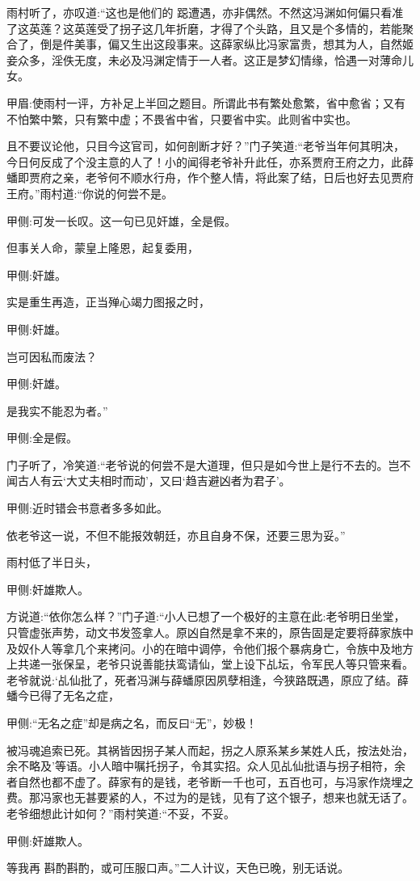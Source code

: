 \begin{parag}
    雨村听了，亦叹道:“这也是他们的 跽遭遇，亦非偶然。不然这冯渊如何偏只看准了这英莲？这英莲受了拐子这几年折磨，才得了个头路，且又是个多情的，若能聚合了，倒是件美事，偏又生出这段事来。这薛家纵比冯家富贵，想其为人，自然姬妾众多，淫佚无度，未必及冯渊定情于一人者。这正是梦幻情缘，恰遇一对薄命儿女。\begin{note}甲眉:使雨村一评，方补足上半回之题目。所谓此书有繁处愈繁，省中愈省；又有不怕繁中繁，只有繁中虚；不畏省中省，只要省中实。此则省中实也。\end{note}且不要议论他，只目今这官司，如何剖断才好？”门子笑道:“老爷当年何其明决，今日何反成了个没主意的人了！小的闻得老爷补升此任，亦系贾府王府之力，此薛蟠即贾府之亲，老爷何不顺水行舟，作个整人情，将此案了结，日后也好去见贾府王府。”雨村道:“你说的何尝不是。\begin{note}甲侧:可发一长叹。这一句已见奸雄，全是假。\end{note}但事关人命，蒙皇上隆恩，起复委用，\begin{note}甲侧:奸雄。\end{note}实是重生再造，正当殚心竭力图报之时，\begin{note}甲侧:奸雄。\end{note}岂可因私而废法？\begin{note}甲侧:奸雄。\end{note}是我实不能忍为者。”\begin{note}甲侧:全是假。\end{note}门子听了，冷笑道:“老爷说的何尝不是大道理，但只是如今世上是行不去的。岂不闻古人有云‘大丈夫相时而动’，又曰‘趋吉避凶者为君子’。\begin{note}甲侧:近时错会书意者多多如此。\end{note}依老爷这一说，不但不能报效朝廷，亦且自身不保，还要三思为妥。”
\end{parag}


\begin{parag}
    雨村低了半日头，\begin{note}甲侧:奸雄欺人。\end{note}方说道:“依你怎么样？”门子道:“小人已想了一个极好的主意在此:老爷明日坐堂，只管虚张声势，动文书发签拿人。原凶自然是拿不来的，原告固是定要将薛家族中及奴仆人等拿几个来拷问。小的在暗中调停，令他们报个暴病身亡，令族中及地方上共递一张保呈，老爷只说善能扶鸾请仙，堂上设下乩坛，令军民人等只管来看。老爷就说:‘乩仙批了，死者冯渊与薛蟠原因夙孽相逢，今狭路既遇，原应了结。薛蟠今已得了无名之症，\begin{note}甲侧:“无名之症”却是病之名，而反曰“无”，妙极！\end{note}被冯魂追索已死。其祸皆因拐子某人而起，拐之人原系某乡某姓人氏，按法处治，余不略及’等语。小人暗中嘱托拐子，令其实招。众人见乩仙批语与拐子相符，余者自然也都不虚了。薛家有的是钱，老爷断一千也可，五百也可，与冯家作烧埋之费。那冯家也无甚要紧的人，不过为的是钱，见有了这个银子，想来也就无话了。老爷细想此计如何？”雨村笑道:“不妥，不妥。\begin{note}甲侧:奸雄欺人。\end{note}等我再 斟酌斟酌，或可压服口声。”二人计议，天色已晚，别无话说。
\end{parag}


